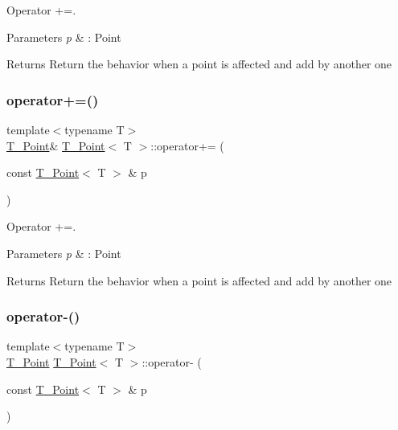 Operator +=. 


\begin{DoxyParams}{Parameters}
{\em p} & \+: Point \\
\hline
\end{DoxyParams}
\begin{DoxyReturn}{Returns}
Return the behavior when a point is affected and add by another one 
\end{DoxyReturn}
\mbox{\label{classT__Point_a4fa7b8ceb837c81e608d5ddad0f1ffe7}} 
\subsubsection{\texorpdfstring{operator+=()}{operator+=()}\hspace{0.1cm}{\footnotesize\ttfamily [2/2]}}
{\footnotesize\ttfamily template$<$typename T$>$ \\
\hyperlink{classT__Point}{T\+\_\+\+Point}\& \hyperlink{classT__Point}{T\+\_\+\+Point}$<$ T $>$\+::operator+= (\begin{DoxyParamCaption}\item[{const \hyperlink{classT__Point}{T\+\_\+\+Point}$<$ T $>$ \&}]{p }\end{DoxyParamCaption})\hspace{0.3cm}{\ttfamily [inline]}}



Operator +=. 


\begin{DoxyParams}{Parameters}
{\em p} & \+: Point \\
\hline
\end{DoxyParams}
\begin{DoxyReturn}{Returns}
Return the behavior when a point is affected and add by another one 
\end{DoxyReturn}
\mbox{\label{classT__Point_a4a3671d0a9763b3e749c799294ebb1ca}} 
\subsubsection{\texorpdfstring{operator-\/()}{operator-()}\hspace{0.1cm}{\footnotesize\ttfamily [1/2]}}
{\footnotesize\ttfamily template$<$typename T$>$ \\
\hyperlink{classT__Point}{T\+\_\+\+Point} \hyperlink{classT__Point}{T\+\_\+\+Point}$<$ T $>$\+::operator-\/ (\begin{DoxyParamCaption}\item[{const \hyperlink{classT__Point}{T\+\_\+\+Point}$<$ T $>$ \&}]{p }\end{DoxyParamCaption})\hspace{0.3cm}{\ttfamily [inline]}}



